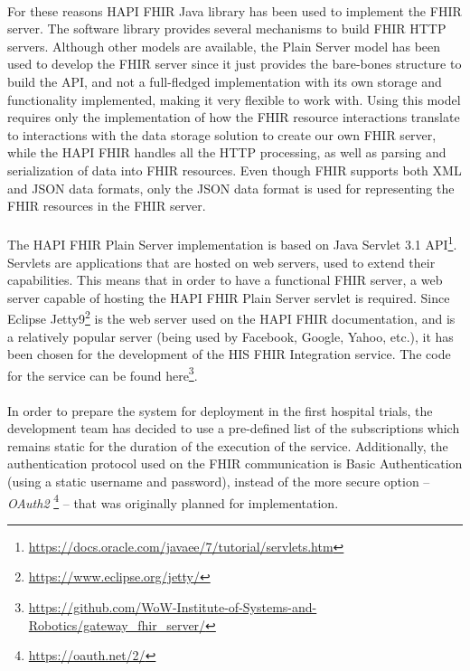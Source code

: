 \paragraph{} For these reasons HAPI FHIR Java library has been used to implement the \acs{FHIR} server. The software library provides several mechanisms to build \acs{FHIR} \acs{HTTP} servers. Although other models are available, the Plain Server model \cite{hapifhir} has been used to develop the \acs{FHIR} server since it just provides the bare-bones structure to build the \acs{API}, and not a full-fledged implementation with its own storage and functionality implemented, making it very flexible to work with. Using this model requires only  the implementation of how the \acs{FHIR} resource interactions translate to interactions with the data storage solution to create our own \acs{FHIR} server, while the HAPI FHIR handles all the \acs{HTTP} processing, as well as parsing and serialization of data into \acs{FHIR} resources. Even though \acs{FHIR} supports both \acf{XML} and \acf{JSON} data formats, only the \acs{JSON} data format is used for representing the \acs{FHIR} resources in the \acs{FHIR} server.

\paragraph{} The HAPI FHIR Plain Server implementation is based on Java Servlet 3.1 \acs{API}\footnote{\url{https://docs.oracle.com/javaee/7/tutorial/servlets.htm}}. Servlets are applications that are hosted on web servers, used to extend their capabilities. This means that in order to have a functional \acs{FHIR} server, a web server capable of hosting the HAPI FHIR Plain Server servlet is required. Since Eclipse Jetty9\footnote{\url{https://www.eclipse.org/jetty/}} is the web server used on the HAPI FHIR documentation, and is a relatively popular server (being used by Facebook, Google, Yahoo, etc.), it has been chosen for the development of the \acs{HIS} \acs{FHIR} Integration service. The code for the service can be found here\footnote{\url{https://github.com/WoW-Institute-of-Systems-and-Robotics/gateway_fhir_server/}}.

\paragraph{} In order to prepare the system for deployment in the first hospital trials, the development team has decided to use a pre-defined list of the subscriptions which remains static for the duration of the execution of the service. Additionally, the authentication protocol used on the \acs{FHIR} communication is Basic Authentication (using a static username and password), instead of the more secure option -- \textit{OAuth2} \footnote{\url{https://oauth.net/2/}} -- that was originally planned for implementation.

